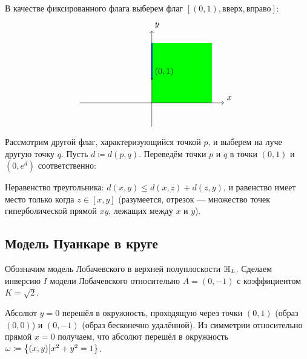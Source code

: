 \documentclass[a4paper]{report}
\begin{document}
{{{        В качестве фиксированного флага выберем флаг $[(0, 1), \text{вверх}, \text{вправо}]$:
        \[\begin{tikzpicture}
              \fill[green] (0, 0) rectangle (2.5, 2.5);
              \draw[->] (-3, 0) -- (3, 0) node[above right] {$x$};
              \draw[->] (0, -1) -- (0, 3) node[above right] {$y$};
              \draw[blue, very thick] (0, 1) -- (0, 2.5);
              \fill (0, 1) circle (1pt) node [above right] {$(0, 1)$};
        \end{tikzpicture}\]

        Рассмотрим другой флаг, характеризующийся точкой $p$, и выберем на луче другую точку $q$.
    Пусть $d \coloneqq d(p, q)$.
        Переведём точки $p$ и $q$ в точки $(0, 1)$ и $(0, e^d)$ соответственно:
    }}
    \item Неравенство треугольника: $d(x, y) \le d(x, z) + d(z, y)$, и равенство имеет место только когда $z \in [x, y]$ (разумеется, отрезок --- множество точек гиперболической прямой $xy$, лежащих между $x$ и $y$).
    }
    \subsection{Модель Пуанкаре в круге}
    Обозначим модель Лобачевского в верхней полуплоскости $\mathbb{H}_L$.
    Сделаем инверсию $I$ модели Лобачевского относительно $A = (0, -1)$ с коэффициентом $K = \sqrt{2}$.

    Абсолют $y = 0$ перешёл в окружность, проходящую через точки $(0, 1)$ (образ $(0, 0)$) и $(0, -1)$ (образ бесконечно удалённой).
    Из симметрии относительно прямой $x = 0$ получаем, что абсолют перешёл в окружность $\omega \coloneqq \left\{(x, y)\middle|x^2+y^2=1\right\}$.
\end{document}
